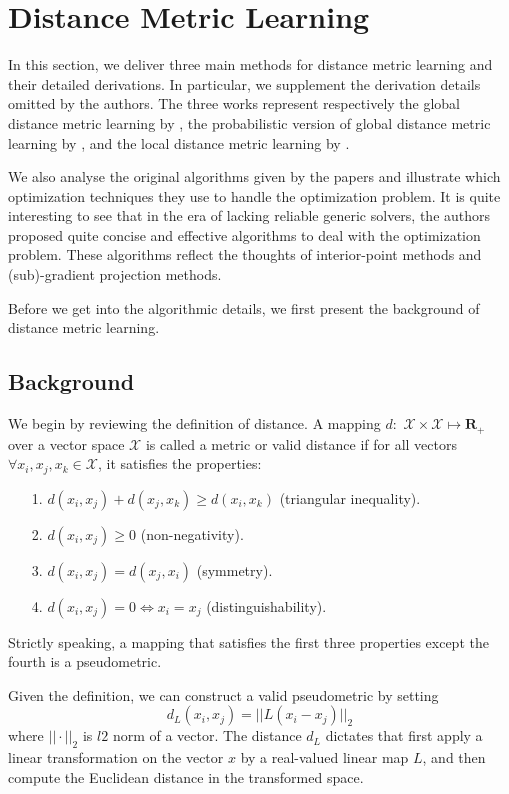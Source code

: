 \documentclass[12pt]{article}
\newcommand\R{\mathbf{R}}
\begin{document}
\section{Distance Metric Learning}
In this section, we deliver three main methods for distance metric learning and their detailed derivations. In particular, we supplement the derivation details omitted by the authors. The three works represent respectively the global distance metric learning by \citet{xing2003distance}, the probabilistic version of global distance metric learning by \citet{yang2006efficient}, and the local distance metric learning by \citet{weinberger2009distance}.

We also analyse the original algorithms given by the papers and illustrate which optimization techniques they use to handle the optimization problem. It is quite interesting to see that in the era of lacking reliable generic solvers, the authors proposed quite concise and effective algorithms to deal with the optimization problem. These algorithms reflect the thoughts of interior-point methods and (sub)-gradient projection methods.

Before we get into the algorithmic details, we first present the background of distance metric learning.

\subsection{Background}
We begin by reviewing the definition of distance. A mapping $d:$ $\mathcal{X}\times\mathcal{X}\mapsto\R_+$ over a vector space $\mathcal{X}$ is called a metric or valid distance if for all vectors $\forall x_i, x_j, x_k\in \mathcal{X}$, it satisfies the properties:
\begin{itemize}[label={}]
\item[1.] $d(x_i,x_j) + d(x_j,x_k)\geq d(x_i,x_k)$ (triangular inequality).
\item[2.] $d(x_i,x_j)\geq 0$ (non-negativity).
\item[3.] $d(x_i,x_j) = d(x_j,x_i)$ (symmetry).
\item[4.] $d(x_i,x_j) = 0 \Longleftrightarrow x_i = x_j$ (distinguishability).
\end{itemize}

Strictly speaking, a mapping that satisfies the first three properties except the fourth is a pseudometric.

Given the definition, we can construct a valid pseudometric by setting \[d_L(x_i,x_j)=||L(x_i-x_j)||_2\] where $||\cdot||_2$ is $l2$ norm of a vector. The distance $d_L$ dictates that first apply a linear transformation on the vector $x$ by a real-valued linear map $L$, and then compute the Euclidean distance in the transformed space.
\end{document}

